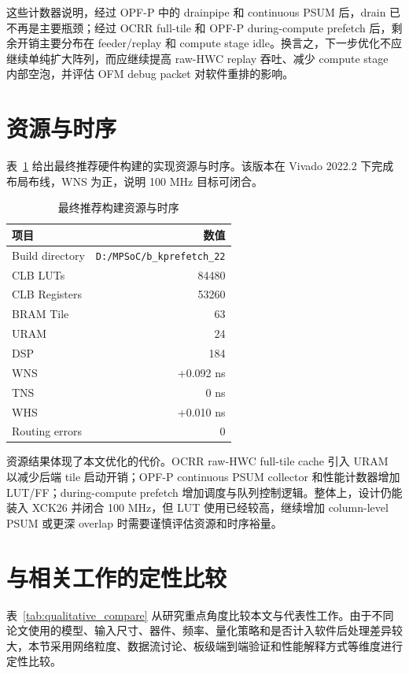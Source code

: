 这些计数器说明，经过 OPF-P 中的 drainpipe 和 continuous PSUM 后，drain 已不再是主要瓶颈；经过 OCRR full-tile 和 OPF-P during-compute prefetch 后，剩余开销主要分布在 feeder/replay 和 compute stage idle。换言之，下一步优化不应继续单纯扩大阵列，而应继续提高 raw-HWC replay 吞吐、减少 compute stage 内部空泡，并评估 OFM debug packet 对软件重排的影响。

\section{资源与时序}

表~\ref{tab:resource} 给出最终推荐硬件构建的实现资源与时序。该版本在 Vivado 2022.2 下完成布局布线，WNS 为正，说明 100 MHz 目标可闭合。

\begin{table}[htb]
\centering
\caption{最终推荐构建资源与时序}
\label{tab:resource}
\begin{tabular}{lr}
\toprule
项目 & 数值 \\
\midrule
Build directory & \texttt{D:/MPSoC/b\_kprefetch\_22} \\
CLB LUTs & 84480 \\
CLB Registers & 53260 \\
BRAM Tile & 63 \\
URAM & 24 \\
DSP & 184 \\
WNS & +0.092 ns \\
TNS & 0 ns \\
WHS & +0.010 ns \\
Routing errors & 0 \\
\bottomrule
\end{tabular}
\end{table}

资源结果体现了本文优化的代价。OCRR raw-HWC full-tile cache 引入 URAM 以减少后端 tile 启动开销；OPF-P continuous PSUM collector 和性能计数器增加 LUT/FF；during-compute prefetch 增加调度与队列控制逻辑。整体上，设计仍能装入 XCK26 并闭合 100 MHz，但 LUT 使用已经较高，继续增加 column-level PSUM 或更深 overlap 时需要谨慎评估资源和时序裕量。

\section{与相关工作的定性比较}

表~\ref{tab:qualitative_compare} 从研究重点角度比较本文与代表性工作。由于不同论文使用的模型、输入尺寸、器件、频率、量化策略和是否计入软件后处理差异较大，本节采用网络粒度、数据流讨论、板级端到端验证和性能解释方式等维度进行定性比较。

